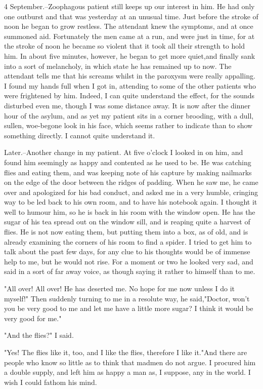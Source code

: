 4 September.--Zoophagous patient still keeps up our interest in him. He had only one outburst and that was yesterday at an unusual time. Just before the stroke of noon he began to grow restless. The attendant knew the symptoms, and at once summoned aid. Fortunately the men came at a run, and were just in time, for at the stroke of noon he became so violent that it took all their strength to hold him. In about five minutes, however, he began to get more quiet,and finally sank into a sort of melancholy, in which state he has remained up to now. The attendant tells me that his screams whilst in the paroxysm were really appalling. I found my hands full when I got in, attending to some of the other patients who were frightened by him. Indeed, I can quite understand the effect, for the sounds disturbed even me, though I was some distance away. It is now after the dinner hour of the asylum, and as yet my patient sits in a corner brooding, with a dull, sullen, woe-begone look in his face, which seems rather to indicate than to show something directly. I cannot quite understand it. 

Later.--Another change in my patient. At five o'clock I looked in on him, and found him seemingly as happy and contented as he used to be. He was catching flies and eating them, and was keeping note of his capture by making nailmarks on the edge of the door between the ridges of padding. When he saw me, he came over and apologized for his bad conduct, and asked me in a very humble, cringing way to be led back to his own room, and to have his notebook again. I thought it well to humour him, so he is back in his room with the window open. He has the sugar of his tea spread out on the window sill, and is reaping quite a harvest of flies. He is not now eating them, but putting them into a box, as of old, and is already examining the corners of his room to find a spider. I tried to get him to talk about the past few days, for any clue to his thoughts would be of immense help to me, but he would not rise. For a moment or two he looked very sad, and said in a sort of far away voice, as though saying it rather to himself than to me. 

"All over! All over! He has deserted me. No hope for me now unless I do it myself!" Then suddenly turning to me in a resolute way, he said,"Doctor, won't you be very good to me and let me have a little more sugar? I think it would be very good for me." 

"And the flies?" I said. 

"Yes! The flies like it, too, and I like the flies, therefore I like it."And there are people who know so little as to think that madmen do not argue. I procured him a double supply, and left him as happy a man as, I suppose, any in the world. I wish I could fathom his mind. 

